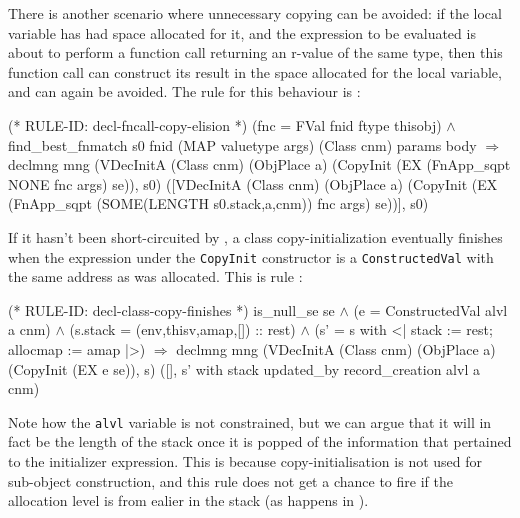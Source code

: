 \documentclass[11pt]{article}
\begin{document}
There is another scenario where unnecessary copying can be avoided: if
the local variable has had space allocated for it, and the expression
to be evaluated is about to perform a function call returning an
r-value of the same type, then this function call can construct its
result in the space allocated for the local variable, and
 can again be avoided.  The rule for this
behaviour is :
\begin{stdrule}
(* RULE-ID: decl-fncall-copy-elision *)
     (fnc = FVal fnid ftype thisobj) \(\land\)
     find_best_fnmatch s0 fnid (MAP valuetype args)
                       (Class cnm) params body
   \(\Rightarrow\)
     declmng mng
       (VDecInitA (Class cnm) (ObjPlace a)
                  (CopyInit (EX (FnApp_sqpt NONE fnc args) se)),
        s0)
       ([VDecInitA
           (Class cnm) (ObjPlace a)
           (CopyInit
              (EX (FnApp_sqpt (SOME(LENGTH s0.stack,a,cnm))
                              fnc
                              args)
                  se))],
        s0)
\end{stdrule}
If it hasn't been short-circuited by
, a class copy-initialization
eventually finishes when the expression under the \texttt{CopyInit}
constructor is a \texttt{ConstructedVal} with the same address as was
allocated.  This is rule :%
%
\begin{stdrule}
(* RULE-ID: decl-class-copy-finishes *)
     is_null_se se \(\land\)
     (e = ConstructedVal alvl a cnm) \(\land\)
     (s.stack = (env,thisv,amap,[]) :: rest) \(\land\)
     (s' = s with <| stack := rest; allocmap := amap |>)
   \(\Rightarrow\)
     declmng mng
       (VDecInitA (Class cnm) (ObjPlace a)
                  (CopyInit (EX e se)), s)
       ([], s' with stack updated_by record_creation alvl a cnm)
\end{stdrule}
Note how the \texttt{alvl} variable is not constrained, but we can
argue that it will in fact be the length of the stack once it is
popped of the information that pertained to the initializer expression.
This is because copy-initialisation is not used for sub-object
construction, and this rule does not get a chance to fire if the
allocation level is from ealier in the stack (as happens in
).
\end{document}
